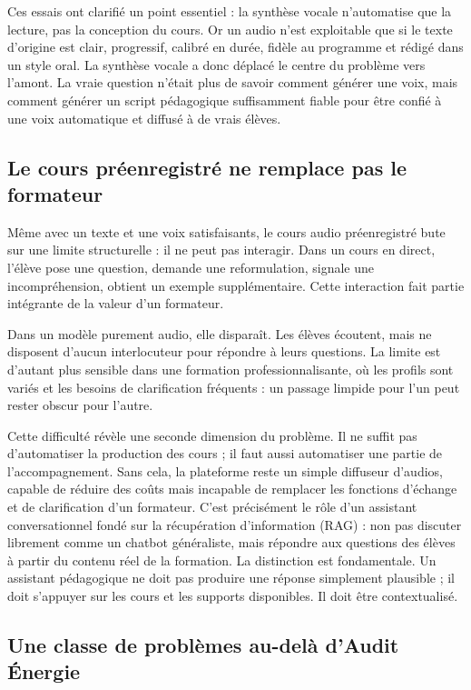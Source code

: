 Ces essais ont clarifié un point essentiel : la synthèse vocale n'automatise que la lecture,
pas la conception du cours. Or un audio n'est exploitable que si le texte d'origine est clair,
progressif, calibré en durée, fidèle au programme et rédigé dans un style oral. La synthèse
vocale a donc déplacé le centre du problème vers l'amont. La vraie question n'était plus de
savoir comment générer une voix, mais comment générer un script pédagogique
suffisamment fiable pour être confié à une voix automatique et diffusé à de vrais élèves.

\subsection{Le cours préenregistré ne remplace pas le formateur}

Même avec un texte et une voix satisfaisants, le cours audio préenregistré bute sur une
limite structurelle : il ne peut pas interagir. Dans un cours en direct, l'élève pose une
question, demande une reformulation, signale une incompréhension, obtient un exemple
supplémentaire. Cette interaction fait partie intégrante de la valeur d'un formateur.

Dans un modèle purement audio, elle disparaît. Les élèves écoutent, mais ne disposent
d'aucun interlocuteur pour répondre à leurs questions. La limite est d'autant plus sensible
dans une formation professionnalisante, où les profils sont variés et les besoins de
clarification fréquents : un passage limpide pour l'un peut rester obscur pour l'autre.

Cette difficulté révèle une seconde dimension du problème. Il ne suffit pas d'automatiser
la production des cours ; il faut aussi automatiser une partie de l'accompagnement. Sans
cela, la plateforme reste un simple diffuseur d'audios, capable de réduire des coûts mais
incapable de remplacer les fonctions d'échange et de clarification d'un formateur. C'est
précisément le rôle d'un assistant conversationnel fondé sur la récupération d'information
(RAG) : non pas discuter librement comme un chatbot généraliste, mais répondre aux
questions des élèves à partir du contenu réel de la formation. La distinction est
fondamentale. Un assistant pédagogique ne doit pas produire une réponse simplement
plausible ; il doit s'appuyer sur les cours et les supports disponibles. Il doit être
contextualisé.

\subsection{Une classe de problèmes au-delà d'Audit Énergie}

